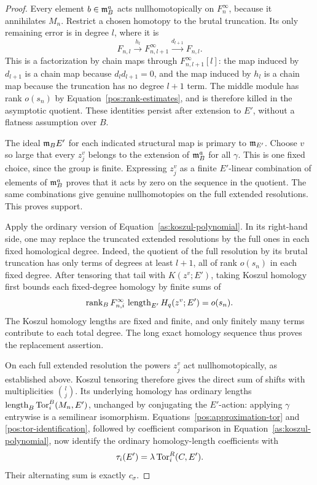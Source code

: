 \begin{proof}
Every element $b\in\mathfrak{m}_B^a$ acts nullhomotopically on
$F_n^\infty$, because it annihilates $M_n$.  Restrict a chosen
homotopy to the brutal truncation.  Its only remaining error is
in degree $l$, where it is
\begin{equation}\label{pos:truncation-error}
 F_{n,l}\xrightarrow{h_l}F_{n,l+1}^\infty
                      \xrightarrow{d_{l+1}}F_{n,l}.
\end{equation}
This is a factorization by chain maps through
$F_{n,l+1}^\infty[l]$: the map induced by $d_{l+1}$ is a chain map
because $d_ld_{l+1}=0$, and the map induced by $h_l$ is a chain map
because the truncation has no degree $l+1$ term.  The middle module has rank
$o(s_n)$ by Equation~\eqref{pos:rank-estimates}, and is therefore killed
in the asymptotic quotient.  These identities persist after
extension to $E'$, without a flatness assumption over $B$.

The ideal $\mathfrak{m}_BE'$ for each indicated structural map is primary
to $\mathfrak{m}_{E'}$.  Choose $v$ so large that every $z_j^v$ belongs to
the extension of $\mathfrak{m}_B^a$ for all $\gamma$.  This is one fixed
choice, since the group is finite.  Expressing $z_j^v$ as a
finite $E'$-linear combination of elements of $\mathfrak{m}_B^a$ proves
that it acts by zero on the sequence in the quotient.  The
same combinations give genuine nullhomotopies on the full
extended resolutions.  This proves support.

Apply the ordinary version of
Equation~\eqref{as:koszul-polynomial}.  In its right-hand side, one may
replace the truncated extended resolutions by the full ones in
each fixed homological degree.  Indeed, the quotient of the
full resolution by its brutal truncation has only terms of
degrees at least $l+1$, all of rank $o(s_n)$ in each fixed degree.
After tensoring that tail with $K(z^v;E')$, taking Koszul
homology first bounds each fixed-degree homology by finite sums
of
\[
 \operatorname{rank}_B F_{n,i}^\infty\,
     \operatorname{length}_{E'} H_q(z^v;E')=o(s_n).
\]
The Koszul homology lengths are fixed and finite, and only
finitely many terms contribute to each total degree.  The long
exact homology sequence thus proves the replacement assertion.

On each full extended resolution the powers $z_j^v$ act
nullhomotopically, as established above.  Koszul tensoring
therefore gives the direct sum of shifts with multiplicities
$\binom lj$.  Its underlying homology has ordinary lengths
$\operatorname{length}_B\operatorname{Tor}_i^B(M_n,E')$, unchanged by conjugating the
$E'$-action: applying $\gamma$ entrywise is a semilinear
isomorphism.  Equations~\eqref{pos:approximation-tor} and
\eqref{pos:tor-identification}, followed by coefficient
comparison in Equation~\eqref{as:koszul-polynomial}, now identify the
ordinary homology-length coefficients with
\[
 \tau_i(E')=\lambda\operatorname{Tor}_i^R(C,E').
\]
Their alternating sum is exactly $c_\sigma$.
\end{proof}

